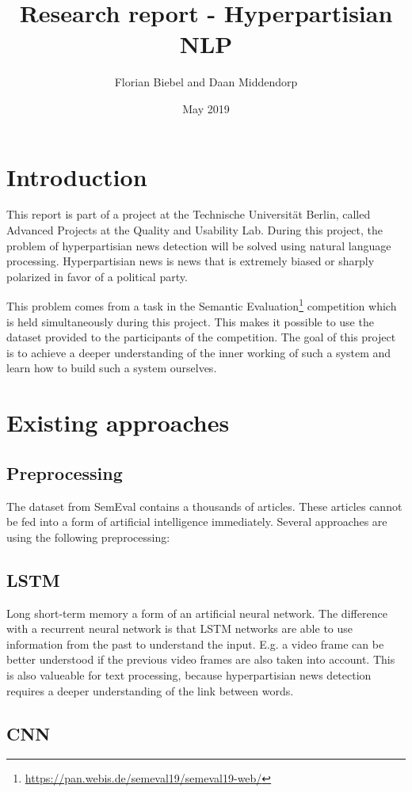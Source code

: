 \documentclass{article}
\title{Research report - Hyperpartisian NLP}
\author{Florian Biebel and Daan Middendorp}
\date{May 2019}
\begin{document}
\maketitle

\section{Introduction}
This report is part of a project at the Technische Universität Berlin, called Advanced Projects at the Quality and Usability Lab. During this project, the problem of hyperpartisian news detection will be solved using natural language processing. Hyperpartisian news is news that is extremely biased or sharply polarized in favor of a political party. 

This problem comes from a task in the Semantic Evaluation\footnote{\url{https://pan.webis.de/semeval19/semeval19-web/}} competition which is held simultaneously during this project. This makes it possible to use the dataset provided to the participants of the competition. The goal of this project is to achieve a deeper understanding of the inner working of such a system and learn how to build such a system ourselves.

\section{Existing approaches}
\subsection{Preprocessing}
The dataset from SemEval contains a thousands of articles. These articles cannot be fed into a form of artificial intelligence immediately. Several approaches are using the following preprocessing:


\subsection{LSTM}
Long short-term memory a form of an artificial neural network. The difference with a recurrent neural network is that LSTM networks are able to use information from the past to understand the input. E.g. a video frame can be better understood if the previous video frames are also taken into account. This is also valueable for text processing, because hyperpartisian news detection requires a deeper understanding of the link between words.
\subsection{CNN}
\end{document}
